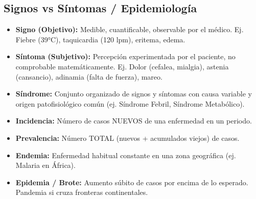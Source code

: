 \documentclass[spanish,letterpaper,oneside]{article}
\begin{document}
\subsection{Signos vs Síntomas / Epidemiología}
\begin{itemize}
    \item \textbf{Signo (Objetivo):} Medible, cuantificable, observable por el médico. Ej. Fiebre (39°C), taquicardia (120 lpm), eritema, edema.
    \item \textbf{Síntoma (Subjetivo):} Percepción experimentada por el paciente, no comprobable matemáticamente. Ej. Dolor (cefalea, mialgia), astenia (cansancio), adinamia (falta de fuerza), mareo.
    \item \textbf{Síndrome:} Conjunto organizado de signos y síntomas con causa variable y origen patofisiológico común (ej. Síndrome Febril, Síndrome Metabólico).
    \item \textbf{Incidencia:} Número de casos NUEVOS de una enfermedad en un periodo.
    \item \textbf{Prevalencia:} Número TOTAL (nuevos + acumulados viejos) de casos.
    \item \textbf{Endemia:} Enfermedad habitual constante en una zona geográfica (ej. Malaria en África).
    \item \textbf{Epidemia / Brote:} Aumento súbito de casos por encima de lo esperado. Pandemia si cruza fronteras continentales.
\end{itemize}

\newpage
\end{document}
